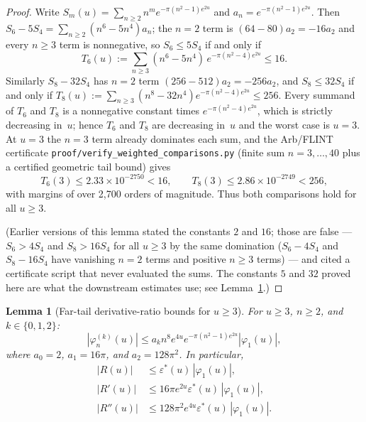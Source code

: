 \documentclass[11pt]{article}
\newtheorem{lemma}[theorem]{Lemma}
\theoremstyle{definition}
\theoremstyle{remark}
\begin{document}
\begin{proof}
Write $S_m(u) = \sum_{n\ge2}n^m e^{-\pi(n^2-1)e^{2u}}$ and
$a_n = e^{-\pi(n^2-1)e^{2u}}$.
Then $S_6 - 5S_4 = \sum_{n\ge2}(n^6 - 5n^4)a_n$; the $n=2$ term is
$(64 - 80)a_2 = -16a_2$ and every $n\ge3$ term is nonnegative, so
$S_6 \le 5S_4$ if and only if
\[
T_6(u) := \sum_{n\ge3}(n^6 - 5n^4)\,e^{-\pi(n^2-4)e^{2u}} \le 16.
\]
Similarly $S_8 - 32S_4$ has $n=2$ term $(256 - 512)a_2 = -256a_2$, and
$S_8 \le 32S_4$ if and only if
$T_8(u) := \sum_{n\ge3}(n^8 - 32n^4)e^{-\pi(n^2-4)e^{2u}} \le 256$.
Every summand of $T_6$ and $T_8$ is a nonnegative constant times
$e^{-\pi(n^2-4)e^{2u}}$, which is strictly decreasing in~$u$; hence
$T_6$ and $T_8$ are decreasing in~$u$ and the worst case is $u = 3$.
At $u = 3$ the $n=3$ term already dominates each sum, and the Arb/FLINT
certificate \texttt{proof/verify\_weighted\_comparisons.py}
(finite sum $n = 3,\ldots,40$ plus a certified geometric tail bound)
gives
\[
T_6(3) \leq 2.33\times 10^{-2750} < 16,
\qquad
T_8(3) \leq 2.86\times 10^{-2749} < 256,
\]
with margins of over 2{,}700 orders of magnitude.
Thus both comparisons hold for all $u\ge3$.

(Earlier versions of this lemma stated the constants $2$ and $16$;
those are false --- $S_6 > 4S_4$ and $S_8 > 16S_4$ for all $u \ge 3$ by
the same domination ($S_6 - 4S_4$ and $S_8 - 16S_4$ have vanishing
$n=2$ terms and positive $n\ge3$ terms) --- and cited a certificate
script that never evaluated the sums.
The constants $5$ and $32$ proved here are what the downstream
estimates use; see Lemma~\ref{lem:fartail_deriv}.)
\end{proof}

\begin{lemma}[Far-tail derivative-ratio bounds for $u\geq3$]\label{lem:fartail_deriv}
For $u\geq 3$, $n\geq 2$, and $k\in\{0,1,2\}$:
\[
|\varphi_n^{(k)}(u)| \leq a_k n^8 e^{4u} e^{-\pi(n^2-1)e^{2u}} |\varphi_1(u)|,
\]
where $a_0=2$, $a_1=16\pi$, and $a_2=128\pi^2$.
In particular,
\begin{align*}
|R(u)| &\leq \varepsilon^*(u)\,|\varphi_1(u)|,\\
|R'(u)| &\leq 16\pi e^{2u}\varepsilon^*(u)\,|\varphi_1(u)|,\\
|R''(u)| &\leq 128\pi^2 e^{4u}\varepsilon^*(u)\,|\varphi_1(u)|.
\end{align*}
\end{lemma}
\end{document}
